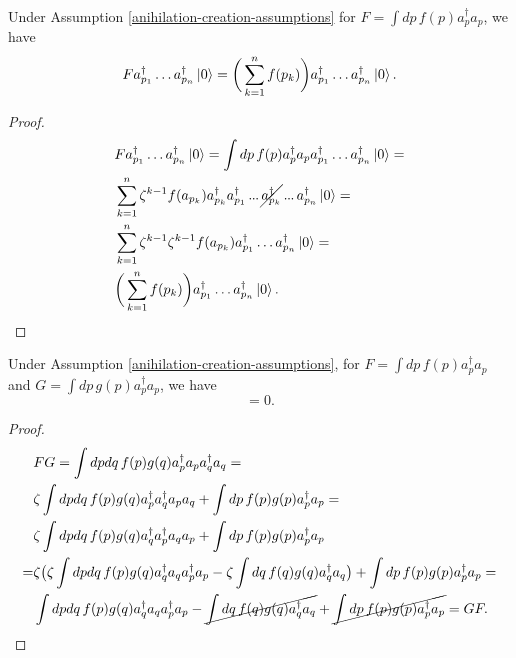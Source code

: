 \documentclass[main.tex]{subfiles}
\begin{document}
\begin{proposition}
\label{count-operators}
Under Assumption \ref{anihilation-creation-assumptions} for $F = \int dp\, f(p)a^\dagger_p a_p$, we have
\begin{equation}
F a^\dagger_{p_1} \dots a^\dagger_{p_n}\ket{0} = \bigg( \sum_{k = 1}^n f(p_k)\bigg) a^\dagger_{p_1}  \dots a^\dagger_{p_n}\ket{0}.
\end{equation}
\end{proposition}
\begin{proof}
\begin{align*}
& F a^\dagger_{p_1} \dots a^\dagger_{p_n}\ket{0} = \int dp\, f(p)a^\dagger_p a_p a^\dagger_{p_1}  \dots a^\dagger_{p_n}\ket{0} = \\
& \sum_{k=1}^n\zeta^{k-1} f(a_{p_k}) a^\dagger_{p_k}
a^\dagger_{p_1} \tdots \cancel{a^\dagger_{p_k}} \tdots a^\dagger_{p_n}\ket{0} = \\
& \sum_{k=1}^n\zeta^{k-1} \zeta^{k-1} f(a_{p_k}) a^\dagger_{p_1}  \dots a^\dagger_{p_n}\ket{0} = \\
& \bigg( \sum_{k = 1}^n f(p_k)\bigg) a^\dagger_{p_1}  \dots a^\dagger_{p_n}\ket{0}.
\end{align*}
\end{proof}

\begin{proposition} Under Assumption \ref{anihilation-creation-assumptions}, for
$F = \int dp\, f(p)a^\dagger_p a_p$ and $G = \int dp\, g(p)a^\dagger_p a_p$, we have
\begin{equation}
[F, G] = 0.
\end{equation} 
\end{proposition}
\begin{proof}
\begin{align*}
&FG = \int dp dq \,f(p)g(q) a^\dagger_p a_p a^\dagger_q a_q = \\
& \zeta \int dp dq \, f(p)g(q) a^\dagger_p  a^\dagger_q a_p a_q + \int dp\, f(p)g(p) a^\dagger_p a_p =  \\
& \zeta \int dp dq\, f(p)g(q) a^\dagger_q a^\dagger_p  a_q  a_p  + \int dp\, f(p)g(p) a^\dagger_p a_p \\ =
& \zeta \big( \zeta \int dp dq\, f(p)g(q) a^\dagger_q a_q a^\dagger_p   a_p - \zeta \int dq\, f(q)g(q) a^\dagger_q    a_q \big)  + \int dp\, f(p)g(p) a^\dagger_p a_p = \\
& \int dp dq\, f(p)g(q) a^\dagger_q a_q a^\dagger_p   a_p - \cancel{\int dq \, f(q)g(q) a^\dagger_q    a_q}  + \cancel{\int dp\, f(p)g(p) a^\dagger_p a_p} 
= GF. \\ 
\end{align*}
\end{proof}
\end{document}

